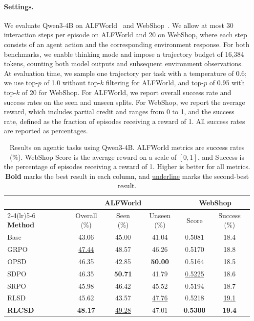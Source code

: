 \paragraph{Settings.} We evaluate Qwen3-4B on ALFWorld~\citep{shridhar2020alfworld} and WebShop~\citep{yao2022webshop}. We allow at most 30 interaction steps per episode on ALFWorld and 20 on WebShop, where each step consists of an agent action and the corresponding environment response. For both benchmarks, we enable thinking mode and impose a trajectory budget of 16,384 tokens, counting both model outputs and subsequent environment observations. At evaluation time, we sample one trajectory per task with a temperature of 0.6; we use top-$p$ of 1.0 without top-$k$ filtering for ALFWorld, and top-$p$ of 0.95 with top-$k$ of 20 for WebShop. For ALFWorld, we report overall success rate and success rates on the seen and unseen splits. For WebShop, we report the average reward, which includes partial credit and ranges from 0 to 1, and the success rate, defined as the fraction of episodes receiving a reward of 1. All success rates are reported as percentages.

\begin{table}[t]
\centering
\caption{Results on agentic tasks using Qwen3-4B. ALFWorld metrics are success rates (\%). WebShop Score is the average reward on a scale of $[0,1]$, and Success is the percentage of episodes receiving a reward of 1. Higher is better for all metrics. \textbf{Bold} marks the best result in each column, and \underline{underline} marks the second-best result.}
\label{tab:agentic}
\small
\setlength{\tabcolsep}{8pt}
\begin{tabular}{lccccc}
\toprule
& \multicolumn{3}{c}{\textbf{ALFWorld}}
& \multicolumn{2}{c}{\textbf{WebShop}} \\
\cmidrule(lr){2-4}\cmidrule(lr){5-6}
\textbf{Method}
& Overall (\%) & Seen (\%) & Unseen (\%)
& Score & Success (\%) \\
\midrule
Base  & 43.06 & 45.00 & 41.04 & 0.5081 & 18.4 \\
GRPO  & \underline{47.44} & 48.57 & 46.26 & 0.5170 & 18.8 \\
OPSD  & 46.35 & 42.85 & \textbf{50.00} & 0.5164 & 18.5 \\
SDPO  & 46.35 & \textbf{50.71} & 41.79 & \underline{0.5225} & 18.6 \\
SRPO  & 45.98 & 46.42 & 45.52 & 0.5194 & 18.7 \\
RLSD  & 45.62 & 43.57 & \underline{47.76} & 0.5218 & \underline{19.1} \\
\rowcolor{gray!30}
\textbf{RLCSD} & \textbf{48.17} & \underline{49.28} & 47.01 & \textbf{0.5300} & \textbf{19.4} \\
\bottomrule
\end{tabular}
\end{table}

